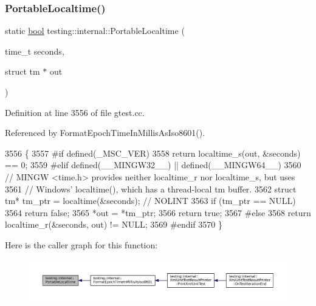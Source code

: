 \subsubsection{\texorpdfstring{Portable\+Localtime()}{PortableLocaltime()}}
{\footnotesize\ttfamily static \hyperlink{classbool}{bool} testing\+::internal\+::\+Portable\+Localtime (\begin{DoxyParamCaption}\item[{time\+\_\+t}]{seconds,  }\item[{struct tm $\ast$}]{out }\end{DoxyParamCaption})\hspace{0.3cm}{\ttfamily [static]}}



Definition at line 3556 of file gtest.\+cc.



Referenced by Format\+Epoch\+Time\+In\+Millis\+As\+Iso8601().


\begin{DoxyCode}
3556                                                               \{
3557 \textcolor{preprocessor}{#if defined(\_MSC\_VER)}
3558   \textcolor{keywordflow}{return} localtime\_s(out, &seconds) == 0;
3559 \textcolor{preprocessor}{#elif defined(\_\_MINGW32\_\_) || defined(\_\_MINGW64\_\_)}
3560   \textcolor{comment}{// MINGW <time.h> provides neither localtime\_r nor localtime\_s, but uses}
3561   \textcolor{comment}{// Windows' localtime(), which has a thread-local tm buffer.}
3562   \textcolor{keyword}{struct }tm* tm\_ptr = localtime(&seconds);  \textcolor{comment}{// NOLINT}
3563   \textcolor{keywordflow}{if} (tm\_ptr == NULL)
3564     \textcolor{keywordflow}{return} \textcolor{keyword}{false};
3565   *out = *tm\_ptr;
3566   \textcolor{keywordflow}{return} \textcolor{keyword}{true};
3567 \textcolor{preprocessor}{#else}
3568   \textcolor{keywordflow}{return} localtime\_r(&seconds, out) != NULL;
3569 \textcolor{preprocessor}{#endif}
3570 \}
\end{DoxyCode}
Here is the caller graph for this function\+:
\nopagebreak
\begin{figure}[H]
\begin{center}
\leavevmode
\includegraphics[width=350pt]{namespacetesting_1_1internal_a60af94307ed4f00a57b5c6d9617c046d_icgraph}
\end{center}
\end{figure}
\mbox{\label{namespacetesting_1_1internal_ab73d250fde6dfbf16111afb7a071dc3f}} 
